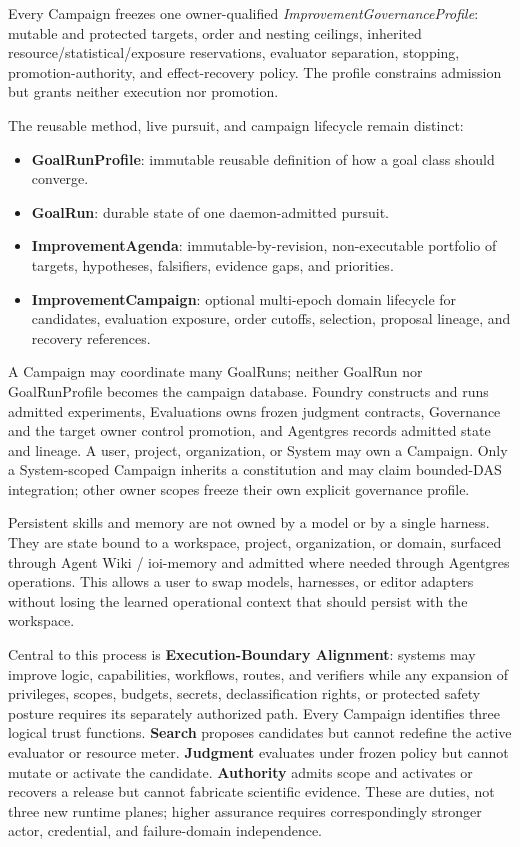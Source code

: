 \documentclass[
  11pt,
]{article}
\providecommand{\tightlist}{%
  \setlength{\itemsep}{0pt}\setlength{\parskip}{0pt}}
\begin{document}
Every Campaign freezes one owner-qualified
\emph{ImprovementGovernanceProfile}: mutable and protected targets, order and
nesting ceilings, inherited resource/statistical/exposure reservations,
evaluator separation, stopping, promotion-authority, and effect-recovery policy.
The profile constrains admission but grants neither execution nor promotion.

The reusable method, live pursuit, and campaign lifecycle remain distinct:

\begin{itemize}
\tightlist
\item
  \textbf{GoalRunProfile}: immutable reusable definition of how a goal class
  should converge.
\item
  \textbf{GoalRun}: durable state of one daemon-admitted pursuit.
\item
  \textbf{ImprovementAgenda}: immutable-by-revision, non-executable portfolio
  of targets, hypotheses, falsifiers, evidence gaps, and priorities.
\item
  \textbf{ImprovementCampaign}: optional multi-epoch domain lifecycle for
  candidates, evaluation exposure, order cutoffs, selection, proposal lineage,
  and recovery references.
\end{itemize}

A Campaign may coordinate many GoalRuns; neither GoalRun nor GoalRunProfile
becomes the campaign database. Foundry constructs and runs admitted experiments,
Evaluations owns frozen judgment contracts, Governance and the target owner
control promotion, and Agentgres records admitted state and lineage.
A user, project, organization, or System may own a Campaign. Only a
System-scoped Campaign inherits a constitution and may claim bounded-DAS
integration; other owner scopes freeze their own explicit governance profile.

Persistent skills and memory are not owned by a model or by a single
harness. They are state bound to a workspace, project, organization, or domain,
surfaced through Agent Wiki / ioi-memory and admitted where needed
through Agentgres operations. This allows a user to swap models,
harnesses, or editor adapters without losing the learned operational
context that should persist with the workspace.

Central to this process is \textbf{Execution-Boundary Alignment}: systems may
improve logic, capabilities, workflows, routes, and verifiers while any
expansion of privileges, scopes, budgets, secrets, declassification rights, or
protected safety posture requires its separately authorized path. Every
Campaign identifies three logical trust functions. \textbf{Search} proposes
candidates but cannot redefine the active evaluator or resource meter.
\textbf{Judgment} evaluates under frozen policy but cannot mutate or activate
the candidate. \textbf{Authority} admits scope and activates or recovers a
release but cannot fabricate scientific evidence. These are duties, not three
new runtime planes; higher assurance requires correspondingly stronger actor,
credential, and failure-domain independence.
\end{document}
